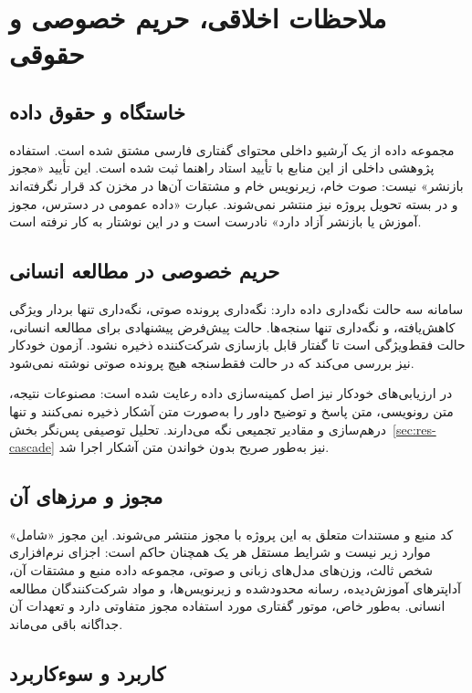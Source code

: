 \section{ملاحظات اخلاقی، حریم خصوصی و حقوقی}
\label{sec:ethics}

\subsection{خاستگاه و حقوق داده}

مجموعه داده از یک آرشیو داخلی محتوای گفتاری فارسی مشتق شده است. استفاده
پژوهشی داخلی از این منابع با تأیید استاد راهنما ثبت شده است. این تأیید
«مجوز بازنشر» نیست: صوت خام، زیرنویس خام و مشتقات آن‌ها در مخزن کد
قرار نگرفته‌اند و در بسته تحویل پروژه نیز منتشر نمی‌شوند. عبارت
«داده عمومی در دسترس، مجوز آموزش یا بازنشر آزاد دارد» نادرست است و در
این نوشتار به کار نرفته است.

\subsection{حریم خصوصی در مطالعه انسانی}

سامانه سه حالت نگه‌داری داده دارد: نگه‌داری پرونده صوتی، نگه‌داری تنها
بردار ویژگی کاهش‌یافته، و نگه‌داری تنها سنجه‌ها. حالت پیش‌فرض پیشنهادی
برای مطالعه انسانی، حالت فقط‌ویژگی است تا گفتار قابل بازسازی شرکت‌کننده
ذخیره نشود. آزمون خودکار نیز بررسی می‌کند که در حالت فقط‌سنجه هیچ پرونده
صوتی نوشته نمی‌شود.

در ارزیابی‌های خودکار نیز اصل کمینه‌سازی داده رعایت شده است: مصنوعات
نتیجه، متن رونویسی، متن پاسخ و توضیح داور را به‌صورت متن آشکار ذخیره
نمی‌کنند و تنها درهم‌سازی و مقادیر تجمیعی نگه می‌دارند. تحلیل توصیفی
پس‌نگر بخش~\ref{sec:res-cascade} نیز به‌طور صریح بدون خواندن متن آشکار
اجرا شد.

\subsection{مجوز و مرزهای آن}

کد منبع و مستندات متعلق به این پروژه با مجوز  منتشر
می‌شوند. این مجوز «شامل» موارد زیر نیست و شرایط مستقل هر یک همچنان
حاکم است: اجزای نرم‌افزاری شخص ثالث، وزن‌های مدل‌های زبانی و صوتی،
مجموعه داده منبع و مشتقات آن، آداپترهای آموزش‌دیده، رسانه محدودشده و
زیرنویس‌ها، و مواد شرکت‌کنندگان مطالعه انسانی. به‌طور خاص، موتور گفتاری
مورد استفاده مجوز متفاوتی دارد و تعهدات آن جداگانه باقی می‌ماند.

\subsection{کاربرد و سوءکاربرد}

